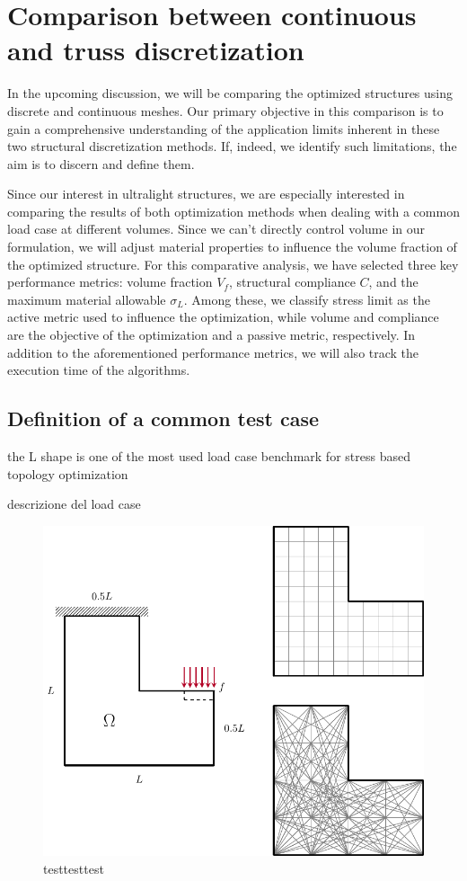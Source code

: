 \section{Comparison between continuous and truss discretization} \label{sec:03_comparison}
In the upcoming discussion, we will be comparing the optimized structures using discrete and continuous meshes. Our primary objective in this comparison is to gain a comprehensive understanding of the application limits inherent in these two structural discretization methods. If, indeed, we identify such limitations, the aim is to discern and define them. 

Since our interest in ultralight structures, we are especially interested in comparing the results of both optimization methods when dealing with a common load case at different volumes. Since we can't directly control volume in our formulation, we will adjust material properties to influence the volume fraction of the optimized structure. For this comparative analysis, we have selected three key performance metrics: volume fraction $V_f$, structural compliance $C$, and the maximum material allowable $\sigma_L$. Among these, we classify stress limit as the active metric used to influence the optimization, while volume and compliance are the objective of the optimization and a passive metric, respectively. In addition to the aforementioned performance metrics, we will also track the execution time of the algorithms.

\subsection{Definition of a common test case}
the L shape is one of the most used load case benchmark for stress based topology optimization 

descrizione del load case



\begin{figure}[]
    \centering
    \includegraphics{figures/03_comparison_TO_TTO/04_L_bc/L_bc.pdf}
    \caption{testtesttest}
    \label{fig:03_L_bc}
\end{figure}

